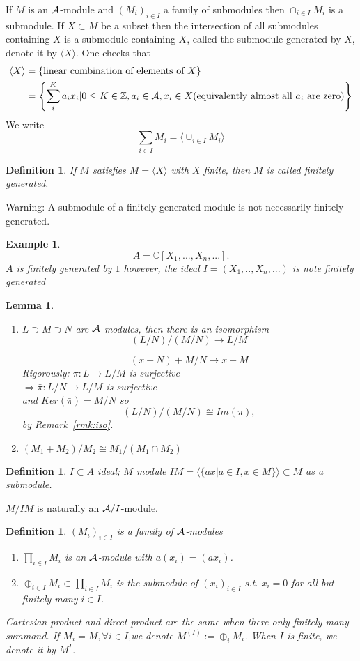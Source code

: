 \documentclass[11pt]{article}
\newtheorem{lemma}[thm]{Lemma}
\newtheorem{dfn}[thm]{Definition}
\newtheorem{ex}[thm]{Example}
\newcommand{\cplx}{\mathbb C}
\newcommand{\intg}{\mathbb Z}
\newcommand{\cala}{{\cal A}}
\newcommand{\rta}{\rightarrow}
\newcommand{\Lrta}{\Longrightarrow}
\newcommand{\lrta}{\longrightarrow}
\newcommand{\lgl}{\langle}
\newcommand{\rgl}{\rangle}
\begin{document}
If $M$ is an $\cala$-module and $(M_i)_{i\in I} $ a family of submodules then $\cap_{i\in I} M_i$ is a submodule.
If $X\subset M$ be a  subset then the intersection of all submodules  containing $X$ is a submodule containing $X$, called the  submodule generated by $X$, denote it by $\lgl X\rgl$.
One checks that 
$$
\begin{aligned}
\lgl X\rgl&=\left\{\text{linear combination of elements of } X\right\}\\
&=\left\{\sum^K_i a_i x_i|0\leq K\in \intg, a_i\in\cala, x_i\in X(\text{equivalently almost all $a_i$ are zero})\right\}
\end{aligned}
$$
We write 
$$
\sum_{i\in I} M_i=\lgl \cup_{i\in I} M_i\rgl
$$
\begin{dfn}
If $M$ satisfies $M=\lgl X\rgl$ with $X$ finite, then $M$ is called finitely generated.
\end{dfn}
Warning:   A submodule of a finitely generated module is not necessarily finitely generated.
\begin{ex}
$$
A=\cplx[X_1,...,X_n,...].
$$
$A$ is finitely generated by $1$ however, the ideal 
$
I=(X_1,..,X_n,...) $ is note finitely generated
\end{ex}

\begin{lemma}\ 
\begin{enumerate}
    \item $L\supset M\supset N$ are $\cala$-modules, then there is an isomorphism 
    $$
        (L/N)/(M/N)\rta L/M
    $$

    $$
    (x+N)+M/N\mapsto x+M
    $$
    Rigorously:
    $\pi: L\lrta L/M$ is surjective\\
    $\Lrta \bar{\pi} :L/N\rta L/M$ is surjective\\
    and $Ker(\bar{\pi})=M/N$ so
     $$
     (L/N)/(M/N)\cong Im(\bar{\pi}),
     $$
     by Remark~\ref{rmk:iso}.
    \item $(M_1+M_2)/M_2\cong M_1/(M_1\cap M_2)$
\end{enumerate}
\end{lemma}
\begin{dfn}
$I\subset A$ ideal; $M$ module $I M=\lgl \{ax|a\in I,x\in M\}\rgl\subset M$ as a submodule.
\end{dfn}
$M/IM$ is naturally an $\cala/I$-module.

\begin{dfn}
$(M_i)_{i \in I}$ is a family of $\cala$-modules
\begin{enumerate}
\item $\prod_{i\in I} M_i$ is an $\cala$-module with $a(x_i)=(a x_i)$.
\item $\oplus_{i\in I} M_i\subset \prod_{i\in I} M_i$ is the submodule of $(x_i)_{i\in I}$ s.t. $x_i=0$ for all but finitely many $i\in I$. 
\end{enumerate}
Cartesian product and direct product are the same when there only finitely many summand. If $M_i=M,\forall i\in I$,we denote $M^{(I)}:=\oplus_i M_i$. When $I$ is finite, we denote it by $M^I$.
\end{dfn}
\end{document}
